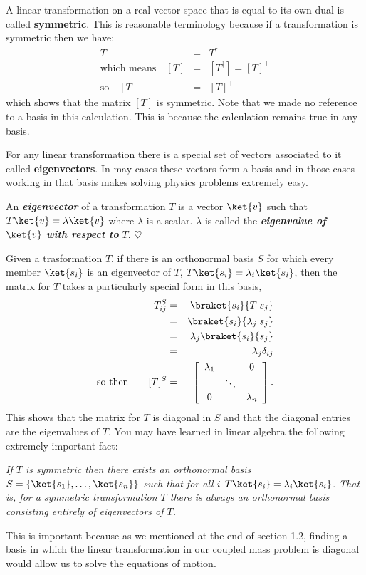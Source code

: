 A linear transformation on a real vector space that is equal to its own dual is called \textbf{symmetric}.  This is reasonable terminology because if a transformation is symmetric then we have:
\begin{eqnarray*} T &=& T^{\dag}\\ \textrm{which means} \quad [T] &=& [T^{\dag}] = [T]^{\top} \\ \textrm{so} \quad [T] &=& [T]^{\top} \end{eqnarray*}
which shows that the matrix $[T]$ is symmetric.  Note that we made no reference to a basis in this calculation.  This is because the calculation remains true in any basis.

For any linear transformation there is a special set of vectors associated to it called \textbf{eigenvectors}. In may cases these vectors form a basis and in those cases working in that basis makes solving physics problems extremely easy.

\begin{definition}
An \textbf{\emph{eigenvector}} of a transformation $T$ is a vector $\ket{v}$ such that \mbox{$T\ket{v} = \lambda \ket{v}$} where $\lambda$ is a scalar.  $\lambda$ is called the \emph{\textbf{eigenvalue of}} $\ket{v}$ \emph{\textbf{with respect to}} $T$. $\heartsuit$
\end{definition}

Given a trasformation $T$, if there is an orthonormal basis $S$ for which every member $\ket{s_i}$ is an eigenvector of $T$, \mbox{$T\ket{s_i}=\lambda_i\ket{s_i}$}, then the matrix for $T$ takes a particularly special form in this basis,
\begin{eqnarray*}
T^{S}_{ij} &=& \braket{s_i}{T|s_j}\\
&=& \braket{s_i}{\lambda _j|s_j}\\
&=& \lambda _j \braket{s_i}{s_j}\\
&=& \lambda _j \delta _{ij}\\
\textrm{so then} \qquad [T]^S &=& \left[ \begin{array}{ccc} \lambda_1 & & 0 \\ & \ddots & \\ 0 & & \lambda_n \end{array} \right].
\end{eqnarray*}
This shows that the matrix for $T$ is diagonal in $S$ and that the diagonal entries are the eigenvalues of $T$.  You may have learned in linear algebra the following extremely important fact:
\begin{center} \emph{If $T$ is symmetric then there exists an orthonormal basis $S = \{\ket{s_1}, \ldots, \ket{s_n} \}$ such that for all $i$ $T\ket{s_i} = \lambda_i\ket{s_i}$.  That is, for a symmetric transformation $T$ there is always an orthonormal basis consisting entirely of eigenvectors of $T$.} \end{center}
This is important because as we mentioned at the end of section 1.2, finding a basis in which the linear transformation in our coupled mass problem is diagonal would allow us to solve the equations of motion.

